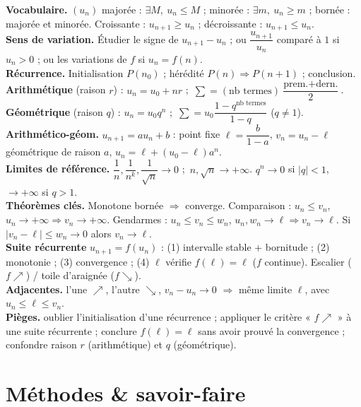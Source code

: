 \begin{synthese}
\textbf{Vocabulaire.} $(u_n)$ majorée : $\exists M,\ u_n\le M$ ; minorée : $\exists m,\ u_n\ge m$ ;
bornée : majorée et minorée. Croissante : $u_{n+1}\ge u_n$ ; décroissante : $u_{n+1}\le u_n$.\\[4pt]
\textbf{Sens de variation.} Étudier le signe de $u_{n+1}-u_n$ ; ou $\dfrac{u_{n+1}}{u_n}$ comparé à $1$
si $u_n>0$ ; ou les variations de $f$ si $u_n=f(n)$.\\[4pt]
\textbf{Récurrence.} Initialisation $P(n_0)$ ; hérédité $P(n)\Rightarrow P(n+1)$ ; conclusion.\\[4pt]
\textbf{Arithmétique} (raison $r$) : $u_n=u_0+nr$ ;\ $\sum=(\text{nb termes})\dfrac{\text{prem.}+\text{dern.}}{2}$.\\[4pt]
\textbf{Géométrique} (raison $q$) : $u_n=u_0q^n$ ;\ $\sum=u_0\dfrac{1-q^{\text{nb termes}}}{1-q}$ ($q\ne1$).\\[4pt]
\textbf{Arithmético-géom.} $u_{n+1}=au_n+b$ : point fixe $\ell=\dfrac b{1-a}$, $v_n=u_n-\ell$
géométrique de raison $a$, $u_n=\ell+(u_0-\ell)a^n$.\\[4pt]
\textbf{Limites de référence.} $\dfrac1n,\dfrac1{n^k},\dfrac1{\sqrt n}\to0$ ;\ $n,\sqrt n\to+\infty$.
$q^n\to0$ si $|q|<1$, $\to+\infty$ si $q>1$.\\[4pt]
\textbf{Théorèmes clés.} Monotone bornée $\Rightarrow$ converge. Comparaison : $u_n\le v_n$,
$u_n\to+\infty\Rightarrow v_n\to+\infty$. Gendarmes : $u_n\le v_n\le w_n$, $u_n,w_n\to\ell\Rightarrow v_n\to\ell$.
Si $|v_n-\ell|\le w_n\to0$ alors $v_n\to\ell$.\\[4pt]
\textbf{Suite récurrente} $u_{n+1}=f(u_n)$ : (1) intervalle stable + bornitude ; (2) monotonie ;
(3) convergence ; (4) $\ell$ vérifie $f(\ell)=\ell$ ($f$ continue). Escalier ($f\nearrow$) / toile d'araignée ($f\searrow$).\\[4pt]
\textbf{Adjacentes.} l'une $\nearrow$, l'autre $\searrow$, $v_n-u_n\to0$ $\Rightarrow$ même limite $\ell$, avec $u_n\le\ell\le v_n$.\\[4pt]
\textbf{Pièges.} oublier l'initialisation d'une récurrence ; appliquer le critère « $f\nearrow$ » à une
suite récurrente ; conclure $f(\ell)=\ell$ sans avoir prouvé la convergence ; confondre raison
$r$ (arithmétique) et $q$ (géométrique).
\end{synthese}

\section{Méthodes \& savoir-faire}

